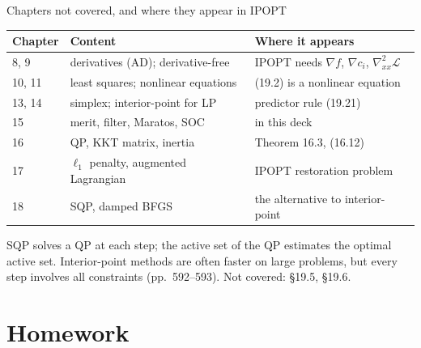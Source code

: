 \documentclass[aspectratio=169,12pt]{beamer}
\newcommand{\cL}{\mathcal{L}}
\newcommand{\hessL}{\nabla_{xx}^{2}\cL}
\begin{document}
\begin{frame}{Chapters not covered, and where they appear in IPOPT}
  \begin{center}\small\setlength\tabcolsep{6pt}
  \renewcommand{\arraystretch}{1.2}
  \begin{tabular}{lll}
    \toprule
    Chapter & Content & Where it appears \\
    \midrule
    8, 9 & derivatives (AD); derivative-free & IPOPT needs $\nabla f$, $\nabla c_{i}$, $\hessL$ \\
    10, 11 & least squares; nonlinear equations & (19.2) is a nonlinear equation \\
    13, 14 & simplex; interior-point for LP & predictor rule (19.21) \\
    15 & merit, filter, Maratos, SOC & in this deck \\
    16 & QP, KKT matrix, inertia & Theorem 16.3, (16.12) \\
    17 & $\ell_{1}$ penalty, augmented Lagrangian & IPOPT restoration problem \\
    18 & SQP, damped BFGS & the alternative to interior-point \\
    \bottomrule
  \end{tabular}
  \end{center}
  SQP solves a QP at each step; the active set of the QP estimates the optimal active set. Interior-point
  methods are often faster on large problems, but every step involves all constraints (pp.~592--593).
  Not covered: \S19.5, \S19.6.
\end{frame}

\section{Homework}
\end{document}
